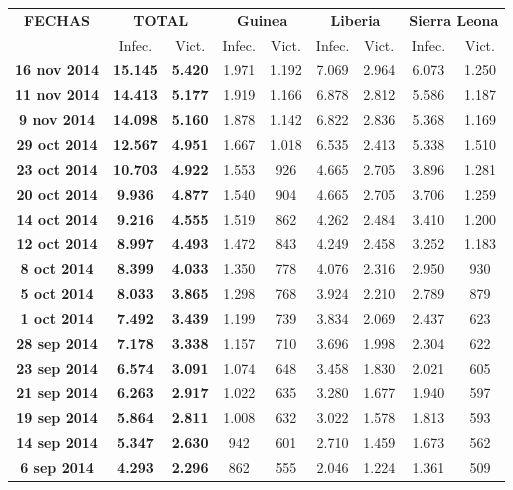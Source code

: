 \documentclass[a4paper,11pt]{article}
\numberwithin{equation}{section}
\begin{document}
\newpage	
\begin{table}[H]
	\centering
		\begin{tabular}{c|cc|cc|cc|cc}
\toprule
\bf FECHAS & \multicolumn{2}{c}{\bf TOTAL}  & \multicolumn{2}{c}{\bf Guinea} & \multicolumn{2}{c}{\bf Liberia} & \multicolumn{2}{c}{\bf Sierra Leona}  \\ 
			& Infec. & Vict. & Infec. & Vict. & Infec. & Vict. & Infec. & Vict. \\ \midrule
\bf 16 nov 2014		&\bf 15.145		&\bf 5.420	&	1.971&	1.192&	7.069& 	2.964&	6.073&	1.250				\\
\bf 11 nov 2014		&\bf 14.413		&\bf 5.177	&	1.919&	1.166&	6.878& 	2.812&	5.586&	1.187    			\\
\bf 9 nov 2014		&\bf 14.098		&\bf 5.160	&	1.878&	1.142&	6.822& 	2.836&	5.368&	1.169    			 \\
\bf 29 oct 2014		&\bf 12.567		&\bf 4.951	&	1.667&	1.018&	6.535& 	2.413&	5.338&	1.510     \\
\bf 23 oct 2014		&\bf 10.703		&\bf 4.922	&	1.553&	926	&	4.665& 	2.705&	3.896&	1.281      \\
\bf 20 oct 2014		&\bf 9.936		&\bf 4.877	&	1.540&	904	&	4.665& 	2.705&	3.706&	1.259       \\
\bf 14 oct 2014		&\bf 9.216		&\bf 4.555	&	1.519&	862	&	4.262& 	2.484&	3.410&	1.200       \\
\bf 12 oct 2014		&\bf 8.997		&\bf 4.493	&	1.472&	843	&	4.249& 	2.458&	3.252&	1.183       \\
\bf 8 oct 2014		&\bf 8.399		&\bf 4.033	&	1.350&	778	&	4.076& 	2.316&	2.950&	930          \\
\bf 5 oct 2014		&\bf 8.033		&\bf 3.865	&	1.298&	768	&	3.924& 	2.210&	2.789&	879          \\
\bf 1 oct 2014		&\bf 7.492		&\bf 3.439	&	1.199&	739	&	3.834& 	2.069&	2.437&	623          \\
\bf 28 sep 2014		&\bf 7.178		&\bf 3.338	&	1.157&	710	&	3.696&	1.998&	2.304&	622        \\
\bf 23 sep 2014		&\bf 6.574		&\bf 3.091	&	1.074&	648	&	3.458& 	1.830&	2.021&	605       \\
\bf 21 sep 2014		&\bf 6.263		&\bf 2.917	&	1.022&	635	&	3.280& 	1.677&	1.940&	597       \\
\bf 19 sep 2014		&\bf 5.864		&\bf 2.811	&	1.008&	632	&	3.022& 	1.578&	1.813&	593       \\
\bf 14 sep 2014		&\bf 5.347		&\bf 2.630	&	942	&	601	&	2.710&	1.459&	1.673&	562         \\
\bf 6 sep 2014		&\bf 4.293		&\bf 2.296	&	862	&	555	&	2.046&	1.224&	1.361&	509          \\

\end{tabular}
\end{table}
\end{document}
